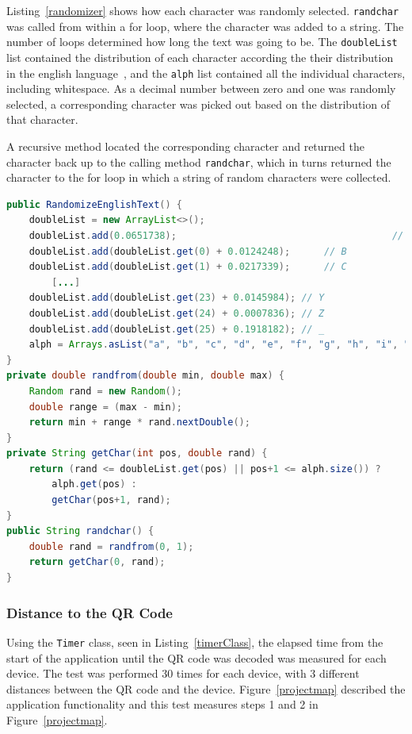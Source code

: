Listing~\ref{randomizer} shows how each character was randomly selected. \texttt{randchar} was called from within a for loop, where the character was added to a string. The number of loops determined how long the text was going to be. The \texttt{doubleList} list contained the distribution of each character according the their distribution in the english language~\cite{englishTextStat}, and the \texttt{alph} list contained all the individual characters, including whitespace. As a decimal number between zero and one was randomly selected, a corresponding character was picked out based on the distribution of that character.

A recursive method located the corresponding character and returned the character back up to the calling method \texttt{randchar}, which in turns returned the character to the for loop in which a string of random characters were collected.

\newpage
\begin{lstlisting}[language=Java, caption={The randomizer class}, label=randomizer]
public RandomizeEnglishText() {
	doubleList = new ArrayList<>();
	doubleList.add(0.0651738);										// A
	doubleList.add(doubleList.get(0) + 0.0124248);		// B
	doubleList.add(doubleList.get(1) + 0.0217339);		// C
		[...]
	doubleList.add(doubleList.get(23) + 0.0145984);	// Y
	doubleList.add(doubleList.get(24) + 0.0007836);	// Z
	doubleList.add(doubleList.get(25) + 0.1918182);	// _
	alph = Arrays.asList("a", "b", "c", "d", "e", "f", "g", "h", "i", "j", "k", "k", "m", "n", "o", "p", "q", "r", "s", "t", "u", "v", "w", "x", "y", "z", " ");
}
private double randfrom(double min, double max) {
	Random rand = new Random();
	double range = (max - min);
	return min + range * rand.nextDouble();
}
private String getChar(int pos, double rand) {
	return (rand <= doubleList.get(pos) || pos+1 <= alph.size()) ?
		alph.get(pos) :
		getChar(pos+1, rand);
}
public String randchar() {
	double rand = randfrom(0, 1);
	return getChar(0, rand);
}
\end{lstlisting}

\subsubsection{Distance to the QR Code}

Using the \texttt{Timer} class, seen in Listing~\ref{timerClass}, the elapsed time from the start of the application until the QR code was decoded was measured for each device. The test was performed 30 times for each device, with 3 different distances between the QR code and the device. Figure~\ref{projectmap} described the application functionality and this test measures steps 1 and 2 in Figure~\ref{projectmap}.

